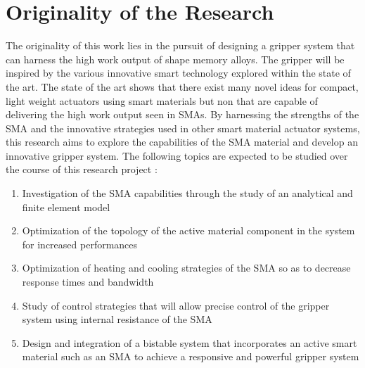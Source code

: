 \section{Originality of the Research} \label{sec:originality}
The originality of this work lies in the pursuit of designing a gripper system that can harness the high work output of shape memory alloys. The gripper will be inspired by the various innovative smart technology explored within the state of the art. The state of the art shows that there exist many novel ideas for compact, light weight actuators using smart materials but non that are capable of delivering the high work output seen in SMAs. By harnessing the strengths of the SMA and the innovative strategies used in other smart material actuator systems, this research aims to explore the capabilities of the SMA material and develop an innovative gripper system. The following topics are expected to be studied over the course of this research project :
\begin{enumerate}
  \item Investigation of the SMA capabilities through the study of an analytical and finite element model
  \item Optimization of the topology of the active material component in the system for increased performances
  \item Optimization of heating and cooling strategies of the SMA so as to decrease response times and bandwidth
  \item Study of control strategies that will allow precise control of the gripper system using internal resistance of the SMA
  \item Design and integration of a bistable system that incorporates an active smart material such as an SMA to achieve a responsive and powerful gripper system
\end{enumerate}
